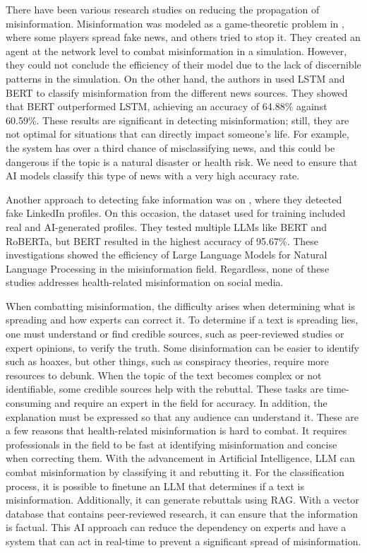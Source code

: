 There have been various research studies on reducing the propagation of misinformation. Misinformation was modeled as a game-theoretic problem in \cite{9906925}, where some players spread fake news, and others tried
to stop it. They created an agent at the network level to combat misinformation in a simulation. However, they could not conclude the efficiency of their model due to the lack of discernible patterns in the simulation. On
the other hand, the authors in \cite{10100054} used LSTM and BERT to classify misinformation from the different news sources. They showed that BERT outperformed LSTM, achieving an accuracy of 64.88\% against 60.59\%. 
These results are significant in detecting misinformation; still, they are not optimal for situations that can directly impact someone's life. For example, the system has over a third chance of misclassifying news, and this could
be dangerous if the topic is a natural disaster or health risk. We need to ensure that AI models classify this type of news with a very high accuracy rate. 

Another approach to detecting fake information was on \cite{Ayoobi_2023}, where they detected fake LinkedIn profiles. On this occasion, the dataset used for training included real and AI-generated profiles. They tested multiple
LLMs like BERT and RoBERTa, but BERT resulted in the highest accuracy of 95.67\%. These investigations showed the efficiency of Large Language Models for Natural Language Processing in the misinformation field. Regardless,
none of these studies addresses health-related misinformation on social media. 

When combatting misinformation, the difficulty arises when determining what is spreading and how experts can correct it. To determine if a text is spreading lies, one must understand or find credible sources,
such as peer-reviewed studies or expert opinions, to verify the truth. Some disinformation can be easier to identify such as hoaxes, but other things, such as conspiracy theories, require more resources to debunk.
When the topic of the text becomes complex or not identifiable, some credible sources help with the rebuttal. These tasks are time-consuming and require an expert in the field for accuracy. In addition, the
explanation must be expressed so that any audience can understand it. These are a few reasons that health-related misinformation is hard to combat. It requires professionals in the field to be fast at identifying
misinformation and concise when correcting them. With the advancement in Artificial Intelligence, LLM can combat misinformation by classifying it and rebutting it. For the classification process, it is possible to
finetune an LLM that determines if a text is misinformation. Additionally, it can generate rebuttals using RAG. With a vector database that contains peer-reviewed research, it can ensure that the information is factual. 
This AI approach can reduce the dependency on experts and have a system that can act in real-time to prevent a significant spread of misinformation.



